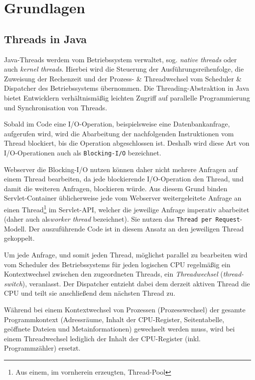 \section{Grundlagen}
\label{section:grundlagen}

\subsection{Threads in Java}
\label{section:threads_java}
Java-Threads werdem vom Betriebssystem verwaltet, sog. \textit{native threads} oder auch \textit{kernel threads}.
Hierbei wird die Steuerung der Ausführungsreihenfolge, die Zuweisung der Rechenzeit und der Prozess- \& Threadwechsel
vom Scheduler \& Dispatcher des Betriebssystems übernommen\parencite[Kapitel 2]{Tanenbaum2016}.
Die Threading-Abstraktion in Java bietet Entwicklern verhältnismäßig leichten Zugriff auf parallelle Programmierung und Synchronisation von Threads.

Sobald im Code eine I/O-Operation, beispielsweise eine Datenbankanfrage, aufgerufen wird, wird die Abarbeitung der nachfolgenden Instruktionen
vom Thread blockiert, bis die Operation abgeschlossen ist.
Deshalb wird diese Art von I/O-Operationen auch als \verb|Blocking-I/O| bezeichnet.

Webserver die Blocking-I/O nutzen können daher nicht mehrere Anfragen auf einem Thread bearbeiten, da jede blockierende I/O-Operation den
Thread, und damit die weiteren Anfragen, blockieren würde.
Aus diesem Grund binden Servlet-Container üblicherweise jede vom Webserver weitergeleitete Anfrage an einen
Thread\footnote{Aus einem, im vornherein erzeugten, Thread-Pool} im Servlet-API, welcher die jeweilige Anfrage imperativ abarbeitet
(daher auch als\textit{worker thread} bezeichnet). Sie nutzen das \verb|Thread per Request|-Modell.
Der auszuführende Code ist in diesem Ansatz an den jeweiligen Thread gekoppelt.

\noindent
Um jede Anfrage, und somit jeden Thread, möglichst parallel zu bearbeiten wird vom Scheduler
des Betriebssystems für jeden logischen CPU regelmäßig ein Kontextwechsel zwischen den zugeordneten Threads,
ein \textit{Threadwechsel} (\textit{thread-switch}), veranlasst.
Der Dispatcher entzieht dabei dem derzeit aktiven Thread die CPU und teilt sie anschließend dem nächsten Thread zu.

Während bei einem Kontextwechsel von Prozessen (Prozesswechsel) der gesamte Programmkontext (Adressräume, Inhalt der CPU-Register,
Seitentabelle, geöffnete Dateien und Metainformationen)
gewechselt werden muss, wird bei einem Threadwechsel lediglich der Inhalt der CPU-Register (inkl. Programmzähler)
ersetzt\parencite{Brosenne2021}\parencite{Mosberger2002}.

